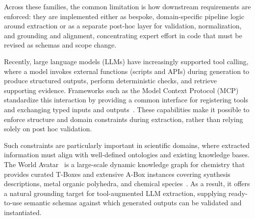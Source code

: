 Across these families, the common limitation is how downstream requirements are enforced: they are implemented either as bespoke, domain-specific pipeline logic around extraction or as a separate post-hoc layer for validation, normalization, and grounding and alignment, concentrating expert effort in code that must be revised as schemas and scope change.


Recently, large language models (LLMs) have increasingly supported tool calling, where a model invokes external functions (scripts and APIs) during generation to produce structured outputs, perform deterministic checks, and retrieve supporting evidence. Frameworks such as the Model Context Protocol (MCP) standardize this interaction by providing a common interface for registering tools and exchanging typed inputs and outputs~\cite{openai2024,anthropic2024mcp,mcp2025spec,yao2023react,schick_toolformer_2023,wu_autogen_2023,liang_survey_2024,ren2024survey,liu_we_2024,li_large_2024}. These capabilities make it possible to enforce structure and domain constraints during extraction, rather than relying solely on post hoc validation.

Such constraints are particularly important in scientific domains, where extracted information must align with well-defined ontologies and existing knowledge bases. The World Avatar~\cite{theworldavatar2025} is a large-scale dynamic knowledge graph for chemistry that provides curated T-Boxes and extensive A-Box instances covering synthesis descriptions, metal organic polyhedra, and chemical species~\cite{pascazio2023,kondinski2022,rihm2025}. As a result, it offers a natural grounding target for tool-augmented LLM extraction, supplying ready-to-use semantic schemas against which generated outputs can be validated and instantiated.



